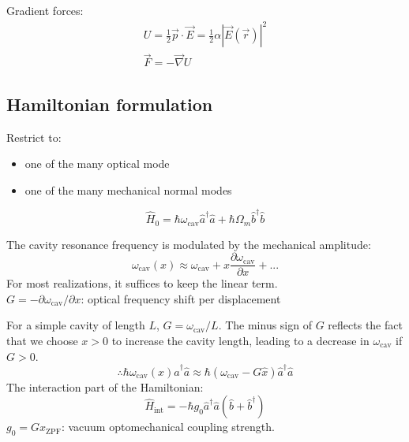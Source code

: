 \documentclass[8pt,a4paper,twocolumn]{article} %
\numberwithin{equation}{section} %
\begin{document}
			Gradient forces:
			\begin{gather}
				U=\frac{1}{2} \vec p \cdot \vec E = \frac{1}{2} \alpha \left| \vec E (\vec r ) \right|^2\\
				\vec F = -\vec \nabla U
			\end{gather}




		\subsection{Hamiltonian formulation} %
		\label{sub:hamiltonian_formulation}
			Restrict to:
			\begin{itemize}
				\item one of the many optical mode
				\item one of the many mechanical normal modes
			\end{itemize}
			\begin{equation}
				\hat H_0=\hbar \omega_{\text{cav}}\hat a^{\dagger}\hat a+\hbar \Omega_m \hat b^{\dagger}\hat b
			\end{equation}

			The cavity resonance frequency is modulated by the mechanical amplitude:
			\begin{equation}
				\omega_{\text{cav}} (x)\approx \omega_{\text{cav}} + x \frac{\partial \omega_{\text{cav}}}{\partial x}+...
			\end{equation}
			For most realizations, it suffices to keep the linear term.\\
			$G=- \partial \omega_{\text{cav}}/\partial x$: optical frequency shift per displacement

			For a simple cavity of length $L$, $G=\omega_{\text{cav}}/L$. The minus sign of $G$ reflects the fact that we choose $x>0$ to increase the cavity length, leading to a decrease in $\omega_{\text{cav}}$ if $G>0$.
			\begin{equation}
				\therefore \hbar \omega_{\text{cav}} (x) \hat a^{\dagger}\hat a \approx \hbar (\omega_{\text{cav}} -G \hat x) \hat  a^{\dagger}\hat a
			\end{equation}
			The interaction part of the Hamiltonian:
			\begin{equation}
				\hat H_{\text{int}}=-\hbar g_0 \hat a^{\dagger}\hat a ( \hat b+\hat b^{\dagger} )
			\end{equation}
			$ g_0=G x_{\text{ZPF}} $: vacuum optomechanical coupling strength.
\end{document}
